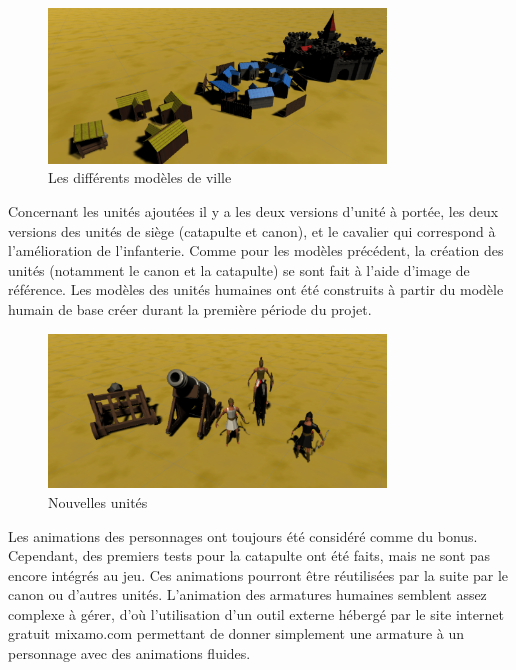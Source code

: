 \documentclass[12pt]{report}
\begin{document}
\begin{figure}[H]
    \centering
    \includegraphics[width=0.8\textwidth]{AllCitiesScreen}
    \caption{Les différents modèles de ville}
\end{figure}

Concernant les unités ajoutées il y a les deux versions d’unité à portée, les
deux versions des unités de siège (catapulte et canon), et le cavalier qui
correspond à l’amélioration de l’infanterie. Comme pour les modèles précédent,
la création des unités (notamment le canon et la catapulte) se sont fait à
l’aide d’image de référence. Les modèles des unités humaines ont été construits
à partir du modèle humain de base créer durant la première période du projet.

\begin{figure}[H]
    \centering
    \includegraphics[width=0.8\textwidth]{NewUnits}
    \caption{Nouvelles unités}
\end{figure}

Les animations des personnages ont toujours été considéré comme du bonus.
Cependant, des premiers tests pour la catapulte ont été faits, mais ne sont pas
encore intégrés au jeu. Ces animations pourront être réutilisées par la suite
par le canon ou d'autres unités. L'animation des armatures humaines semblent
assez complexe à gérer, d'où l'utilisation d'un outil externe hébergé par le
site internet gratuit mixamo.com permettant de donner simplement une armature à
un personnage avec des animations fluides.
\end{document}
